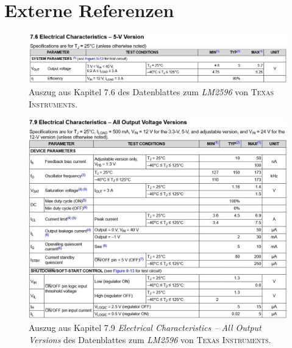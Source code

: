\chapter{Externe Referenzen}
	\begin{figure}[h]
		\centering
		\includegraphics[width=.95\textwidth]{references/auszug_kapitel_7.6.jpg}
		\caption[Auszug aus Kapitel 7.6 des Datenblattes]{Auszug aus Kapitel 7.6 des Datenblattes zum \textit{LM2596} von \textsc{Texas Instruments}.}
		\label{fig:auszug kapitel 7.6}
	\end{figure}
	\newpage
	\begin{figure}[h]
		\centering
		\includegraphics[width=.95\textwidth]{references/auszug_kapitel_7.9.jpg}
		\caption[Auszug aus Kapitel 7.9 des Datenblattes]{Auszug aus Kapitel 7.9 \textit{Electrical Characteristics -- All Output Versions} des Datenblattes zum \textit{LM2596} von \textsc{Texas Instruments}.}
		\label{fig:auszug kapitel 7.9}
	\end{figure}